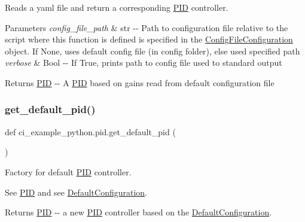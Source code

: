 Reads a yaml file and return a corresponding \hyperlink{classci__example__python_1_1pid_1_1PID}{P\+ID} controller. 


\begin{DoxyParams}{Parameters}
{\em config\+\_\+file\+\_\+path} & str {\ttfamily -\/-\/} Path to configuration file relative to the script where this function is defined is specified in the \hyperlink{classci__example__python_1_1pid_1_1ConfigFileConfiguration}{Config\+File\+Configuration} object. If None, uses default config file (in config folder), else used specified path \\
\hline
{\em verbose} & Bool {\ttfamily -\/-\/} If True, prints path to config file used to standard output\\
\hline
\end{DoxyParams}
\begin{DoxyReturn}{Returns}
\hyperlink{classci__example__python_1_1pid_1_1PID}{P\+ID} {\ttfamily -\/-\/} A \hyperlink{classci__example__python_1_1pid_1_1PID}{P\+ID} based on gains read from default configuration file 
\end{DoxyReturn}
\mbox{\label{namespaceci__example__python_1_1pid_a6fc811a84ce986b8315aabae71987cbf}} 
\subsubsection{\texorpdfstring{get\+\_\+default\+\_\+pid()}{get\_default\_pid()}}
{\footnotesize\ttfamily def ci\+\_\+example\+\_\+python.\+pid.\+get\+\_\+default\+\_\+pid (\begin{DoxyParamCaption}{ }\end{DoxyParamCaption})}



Factory for default \hyperlink{classci__example__python_1_1pid_1_1PID}{P\+ID} controller. 

See \hyperlink{classci__example__python_1_1pid_1_1PID}{P\+ID} and see \hyperlink{classci__example__python_1_1pid_1_1DefaultConfiguration}{Default\+Configuration}.

\begin{DoxyReturn}{Returns}
\hyperlink{classci__example__python_1_1pid_1_1PID}{P\+ID} {\ttfamily -\/-\/} a new \hyperlink{classci__example__python_1_1pid_1_1PID}{P\+ID} controller based on the \hyperlink{classci__example__python_1_1pid_1_1DefaultConfiguration}{Default\+Configuration}. 
\end{DoxyReturn}
\mbox{\label{namespaceci__example__python_1_1pid_ae1f8a5e73e269ede0bdd4d0daf2f265e}} 
